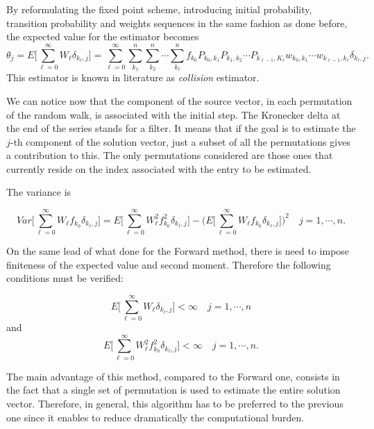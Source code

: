 \documentclass[a4paper,10pt]{article}
\begin{document}
By reformulating the fixed point scheme, introducing initial probability,
transition probability and weights
sequences in the same fashion as done before, the expected value for the
estimator becomes
\begin{equation}
\theta_j=E\bigg[\sum_{\ell=0}^\infty W_{\ell}\delta_{k_{\ell},
j}\bigg]=\sum_{\ell=0}^{\infty}\sum_{k_1}^n\sum_{k_2}^n\cdots\sum_{k_{\ell}}^n
f_{k_0}P_{k_0,k_1}P_{k_1,k_2}\cdots P_{k_{\ell-1},K_{\ell}}w_{k_0,k_1}\cdots
w_{k_{\ell-1},k_{\ell}}\delta_{k_{\ell},j}.
\label{adj_mean}
\end{equation}
This estimator is known in literature as \textit{collision} estimator.

We can notice now that the component of the source vector, in each
permutation of the random walk, is associated with the initial step. The
Kronecker delta
at the end of the series stands for a filter. It means that if the goal is to
estimate the $j$-th component of the solution vector, just a subset of all the
permutations gives a contribution to this. The only permutations considered are
those ones that currently reside on the index associated with the entry to be
estimated.

The variance is

\begin{equation}
Var\bigg [\sum_{\ell=0}^\infty W_{\ell}
f_{k_0}\delta_{k_{\ell},j}\bigg]=E\bigg[\sum_{\ell=0}^\infty W_{\ell}^2
f_{k_0}^2\delta_{k_{\ell},j}\bigg ] - \bigg (E\bigg[\sum_{\ell=0}^\infty
W_{\ell}
f_{k_0}\delta_{k_{\ell},j}\bigg]\bigg )^2\quad j=1,\cdots,n
\label{adj_var}.
\end{equation}

On the same lead of what done for the Forward method, there is need to impose
finiteness of the expected value and second moment. Therefore the following
conditions must be verified:

\begin{equation}
 E\bigg[\sum_{\ell=0}^\infty W_{\ell}\delta_{k_{\ell},
j}\bigg]<\infty \quad j=1,\cdots,n
\end{equation}
and
\begin{equation}
 E\bigg[\sum_{\ell=0}^\infty W_{\ell}^2
f_{k_0}^2\delta_{k_{\ell},j}\bigg]<\infty \quad j=1,\cdots,n.
\end{equation}

The main advantage of this method, compared to the Forward one, consists in the
fact that a single set of permutation is used to estimate the entire solution
vector. Therefore, in general, this algorithm has to be preferred to the
previous one since it enables to reduce dramatically the computational burden.
\end{document}
